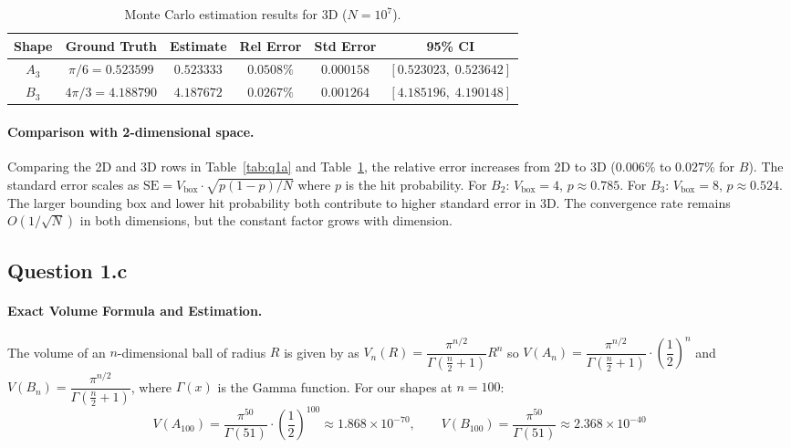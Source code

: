 \documentclass[a4paper,10pt]{article}
\theoremstyle{nonumberplain}
\theoremstyle{nonumberplain}
\theoremstyle{nonumberplain}
\theoremstyle{nonumberplain}
\begin{document}
\begin{table}[H]
\centering
\caption{Monte Carlo estimation results for 3D ($N = 10^7$).}
\label{tab:q1b}
\begin{tabular}{cccccc}
\hline
\textbf{Shape} & \textbf{Ground Truth} & \textbf{Estimate} & \textbf{Rel Error} & \textbf{Std Error} & \textbf{95\% CI} \\
\hline
$A_3$ & $\pi/6 = 0.523599$ & $0.523333$ & $0.0508\%$ & $0.000158$ & $[0.523023,\; 0.523642]$ \\
$B_3$ & $4\pi/3 = 4.188790$ & $4.187672$ & $0.0267\%$ & $0.001264$ & $[4.185196,\; 4.190148]$ \\
\hline
\end{tabular}
\end{table}

\paragraph{Comparison with 2-dimensional space.}

Comparing the 2D and 3D rows in Table~\ref{tab:q1a} and Table~\ref{tab:q1b}, the relative error increases from 2D to 3D ($0.006\%$ to $0.027\%$ for $B$). The standard error scales as $\text{SE} = V_{\text{box}} \cdot \sqrt{p(1-p)/N}$ where $p$ is the hit probability. For $B_2$: $V_{\text{box}} = 4$, $p \approx 0.785$. For $B_3$: $V_{\text{box}} = 8$, $p \approx 0.524$. The larger bounding box and lower hit probability both contribute to higher standard error in 3D. The convergence rate remains $O(1/\sqrt{N})$ in both dimensions, but the constant factor grows with dimension.

\subsection{Question 1.c}

\paragraph{Exact Volume Formula and Estimation.}

The volume of an $n$-dimensional ball of radius $R$ is given by \cite[Exercise~4.29]{vershynin2018} as
$V_n(R) = \dfrac{\pi^{n/2}}{\Gamma\!\left(\frac{n}{2}+1\right)}R^n$ so $V(A_n) = \dfrac{\pi^{n/2}}{\Gamma\!\left(\frac{n}{2}+1\right)}\cdot \left( \dfrac{1}{2} \right)^n$ and $V(B_n) =  \dfrac{\pi^{n/2}}{\Gamma\!\left(\frac{n}{2}+1\right)}$,
where $\Gamma(x)$ is the Gamma function. For our shapes at $n=100$:
$$
V(A_{100}) = \frac{\pi^{50}}{\Gamma(51)} \cdot \left(\frac{1}{2}\right)^{100} \approx 1.868 \times 10^{-70}, \qquad
V(B_{100}) = \frac{\pi^{50}}{\Gamma(51)} \approx 2.368 \times 10^{-40}
$$
\end{document}
